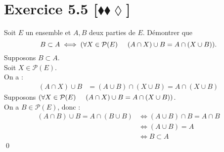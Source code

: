 \documentclass[10pt]{article}
\begin{document}
\section*{Exercice 5.5 [$\blacklozenge\blacklozenge\lozenge$]}
\begin{tcolorbox}[enhanced, width=7in, center, size=fbox, fontupper=\large, drop shadow southwest]
    Soit $E$ un ensemble et $A,B$ deux parties de $E$. Démontrer que
    \begin{equation*}
        B \subset A \iff (\forall X \in \mathcal{P}(E) \hspace{0.5cm} (A \cap X) \cup B = A \cap (X \cup B)).
    \end{equation*}
    Supposons $B \subset A$.\\
    Soit $X \in \mathcal{P}(E)$.\\
    On a :
    \begin{align*}
        (A \cap X) \cup B &= (A \cup B) \cap (X \cup B) = A \cap (X \cup B)
    \end{align*}
    Supposons $(\forall X \in \mathcal{P}(E) \hspace{0.5cm} (A \cap X) \cup B = A \cap (X \cup B))$.\\
    On a $B \in \mathcal{P}(E)$, donc :
    \begin{align*}
        (A \cap B) \cup B = A \cap (B \cup B) &\iff (A \cup B) \cap B = A \cap B\\
        &\iff (A \cup B) = A\\
        &\iff B \subset A
    \end{align*}
    \qed
\end{tcolorbox}

\end{document}
